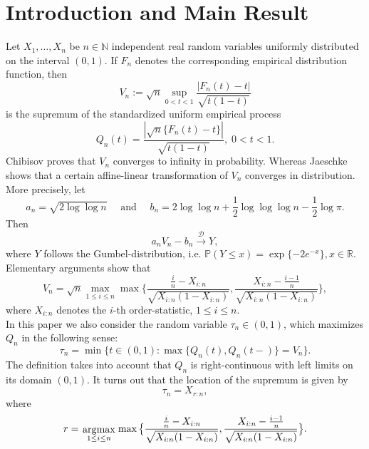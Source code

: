 \documentclass[sn-mathphys,Numbered]{sn-jnl}%
\theoremstyle{thmstyleone}%
\theoremstyle{thmstyletwo}%
\theoremstyle{thmstylethree}%
\newcommand{\argmax}{\raisebox{-1.8mm}{${{\displaystyle \rm arg\,\! max}
                     \atop {\scriptstyle 1 \le i \le n}}$}}
\begin{document}
\section{Introduction and Main Result}
Let $X_1,\ldots,X_n$ be $n \in \mathbb{N}$ independent real random variables uniformly distributed on the interval $(0,1)$.
If $F_n$ denotes the corresponding empirical distribution function, then
$$
 V_n:=\sqrt{n} \sup_{0<t<1}\frac{|F_n(t)-t|}{\sqrt{t(1-t)}}
$$
is the supremum of the standardized uniform empirical process
$$
 Q_n(t)=\frac{|\sqrt{n}\{F_n(t)-t\}|}{\sqrt{t(1-t)}}, \; 0<t<1.
$$
Chibisov \cite{Chibisov} proves that $V_n$ converges to infinity in probability.
Whereas Jaeschke \cite{Jaeschke} shows that a certain affine-linear transformation of $V_n$ converges in distribution. More precisely,
let
\begin{equation} \label{anbn}
a_n=\sqrt{2 \log \log n} \quad \text{ and } \quad b_n=2 \log \log n+\frac{1}{2}\log \log \log n -\frac{1}{2} \log \pi.
\end{equation}
Then
\begin{equation} \label{limitJaeschke}
 a_n V_n - b_n \stackrel{\mathcal{D}}{\rightarrow} Y,
\end{equation}
where $Y$ follows the Gumbel-distribution, i.e. $\mathbb{P}(Y \le x)= \exp\{-2 e^{-x}\}, x \in \mathbb{R}.$ \\

Elementary arguments show that
\begin{equation} \label{sup}
 V_n = \sqrt{n} \max_{1 \le i \le n} \max \big\{\frac{\frac{i}{n}-X_{i:n}}{\sqrt{X_{i:n}(1-X_{i:n})}},\frac{X_{i:n}-\frac{i-1}{n}}{\sqrt{X_{i:n}(1-X_{i:n})}}\big\},
\end{equation}
where $X_{i:n}$ denotes the $i$-th order-statistic, $1 \le i \le n$.\\


In this paper we also consider the random variable $\tau_n \in (0,1)$, which maximizes $Q_n$ in the following sense:
\begin{equation} \label{deftaun}
 \tau_n = \min \{ t \in (0,1): \max\{Q_n(t),Q_n(t-)\}= V_n\}.
\end{equation}
The definition takes into account that $Q_n$ is right-continuous with left limits on its domain $(0,1)$. It turns out that the location of the supremum is given by $$\tau_n=X_{r:n},$$
where
\begin{equation} \label{indexr}
 r = \argmax \max \big\{\frac{\frac{i}{n}-X_{i:n}}{\sqrt{X_{i:n}(1-X_{i:n})}},\frac{X_{i:n}-\frac{i-1}{n}}{\sqrt{X_{i:n}(1-X_{i:n})}}\big\}.
\end{equation}
\end{document}

